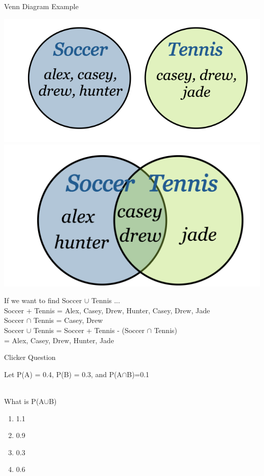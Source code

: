 \documentclass{beamer}
\begin{document}
\begin{frame}{Venn Diagram Example}
	\begin{centering}
		\includegraphics[height=0.25\textwidth]{vd1}
		\includegraphics[height=0.25\textwidth]{vd2}
	\end{centering}
	
	\small{
		If we want to find Soccer $\cup$ Tennis ... \\
		Soccer + Tennis = Alex, Casey, Drew, Hunter, Casey, Drew, Jade \\
		
		Soccer $\cap$ Tennis = Casey, Drew\\
		
		Soccer $\cup$ Tennis = Soccer + Tennis - (Soccer $\cap$ Tennis)}\\
	\hspace{30mm}= Alex, Casey, Drew, Hunter, Jade
\end{frame}

\begin{frame}{Clicker Question}
	\begin{centering}
		Let P(A) = 0.4, P(B) = 0.3, and P(A$\cap$B)=0.1
	\end{centering}
	\\
	What is P(A$\cup$B)
	\begin{enumerate}[label=(\alph*)]
		\item 1.1
		\item 0.9
		\item 0.3
		\item 0.6
	\end{enumerate}
\end{frame}
\end{document}
